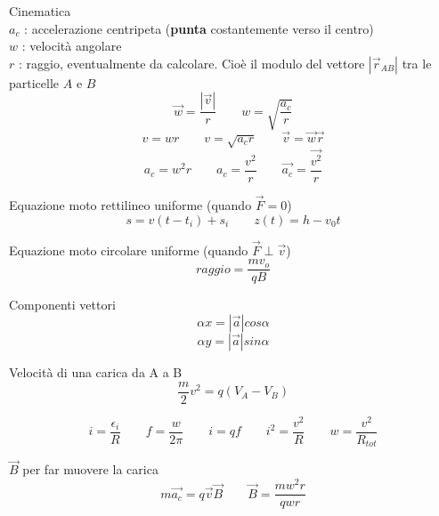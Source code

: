 \documentclass[14pt]{extarticle}
\begin{document}
Cinematica\\
$a_c$ : accelerazione centripeta (\textbf{punta} costantemente verso il centro)\\
$w$ : velocità angolare\\
$r$ : raggio, eventualmente da calcolare. Cioè il modulo del vettore $|\overrightarrow{r}_{AB}|$  tra le particelle $A$ e $B$
\begin{equation*}
    \overrightarrow{w}=\frac{\left | \overrightarrow v \right |}{r}
    \quad\quad
    w=\sqrt{\frac{a_c}{r}}
\end{equation*}
\begin{equation*}
    v=wr
    \quad\quad
    v=\sqrt{a_cr}
    \quad\quad
    \overrightarrow{v}=\overrightarrow{w}\overrightarrow{r}
\end{equation*}
\begin{equation*}
    a_c=w^2r
    \quad\quad
    a_c=\frac{v^2}{r}
    \quad\quad
    \overrightarrow{a_c}=\frac{\overrightarrow{v^2}}{r}
\end{equation*}


Equazione moto rettilineo uniforme (quando $\overrightarrow{F}=0$)
\begin{equation*}
    s=v(t-t_i)+s_i
    \quad\quad
    z(t)=h-v_0t
\end{equation*}

Equazione moto circolare uniforme (quando $\overrightarrow{F}\perp\overrightarrow{v}$)
\begin{equation*}
    raggio = \frac{mv_o}{qB}
\end{equation*}

Componenti vettori
\begin{equation*}
    \alpha x= \left | \overrightarrow{a} \right |cos\alpha
\end{equation*}
\begin{equation*}
    \alpha y= \left | \overrightarrow{a} \right |sin\alpha
\end{equation*}

Velocità di una carica da A a B
\begin{equation*}
    \frac{m}{2}v^2=q(V_A-V_B)
\end{equation*}

\begin{equation*}
    i=\frac{\epsilon_i}{R}
    \quad\quad
    f=\frac{w}{2\pi}
    \quad\quad
    i=qf
    \quad\quad
    i^2=\frac{v^2}{R}
    \quad\quad
    w=\frac{v^2}{R_{tot}}
\end{equation*}

$\overrightarrow{B}$ per far muovere la carica
\begin{equation*}
    m\overrightarrow{a_c}=q\overrightarrow{v}\overrightarrow{B}
    \quad\quad
    \overrightarrow{B}=\frac{mw^2r}{qwr}
\end{equation*}
\end{document}
